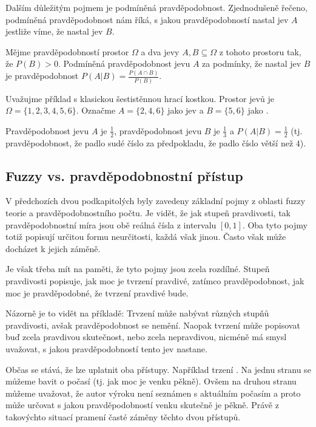 \documentclass[a4paper,10pt]{article}
\begin{document}
Dalším důležitým pojmem je podmíněná pravděpodobnost. Zjednodušeně řečeno, podmíněná pravděpodobnost nám říká, s jakou pravděpodobností nastal jev $A$ jestliže víme, že nastal jev $B$.

\begin{definition}
 Mějme pravděpodobností prostor $\Omega$ a dva jevy $A, B \subseteq \Omega$ z tohoto prostoru tak, že $P(B) > 0$. Podmíněná pravděpodobnost jevu $A$ za podmínky, že nastal jev $B$ je pravděpodobnost $P(A | B) = \frac{P(A \cap B)}{P(B)}$.
\end{definition}

\begin{example}
 Uvažujme příklad s klasickou šestistěnnou hrací kostkou. Prostor jevů je $\Omega = \{ 1,2,3,4,5,6 \}$. Označme $A = \{2, 4, 6\}$ jako jev  a $B = \{ 5, 6 \}$ jako .
 
 Pravděpodobnost jevu $A$ je $\frac{1}{2}$, pravděpodobnost jevu $B$ je $\frac{1}{3}$ a $P(A | B) = \frac{1}{2}$ (tj. pravděpodobnost, že padlo sudé číslo za předpokladu, že padlo číslo větší než $4$).
\end{example}


\subsection{Fuzzy vs. pravděpodobnostní přístup} \label{subsec:FuzzyVsProb}
V předchozích dvou podkapitolých byly zavedeny základní pojmy z oblasti fuzzy teorie a pravděpodobnostního počtu. Je vidět, že jak stupeň pravdivosti, tak pravděpodobnostní míra jsou obě reálná čísla z intervalu $[0, 1]$. Oba tyto pojmy totiž popisují určitou formu neurčitosti, každá však jinou. Často však může docházet k jejich záměně.

Je však třeba mít na paměti, že tyto pojmy jsou zcela rozdílné. Stupeň pravdivosti popisuje, jak moc je tvrzení pravdivé, zatímco pravděpodobnost, jak moc je pravděpodobné, že tvrzení pravdivé bude.

Názorně je to vidět na příkladě: Trvzení  může nabývat různých stupňů pravdivosti, avšak pravděpodobnost se nemění. Naopak tvrzení  může popisovat buď zcela pravdivou skutečnost, nebo zcela nepravdivou, nicméně má smysl uvažovat, s jakou pravděpodobností tento jev nastane.

Občas se stává, že lze uplatnit oba přístupy. Například trzení . Na jednu stranu se můžeme bavit o  počasí (tj. jak moc je venku pěkně). Ovšem na druhou stranu můžeme uvažovat, že autor výroku není seznámen s aktuálním počasím a proto může určovat s jakou pravděpodobností venku skutečně je pěkně. Právě z takovýchto situací pramení časté záměny těchto dvou přístupů.
\end{document}
